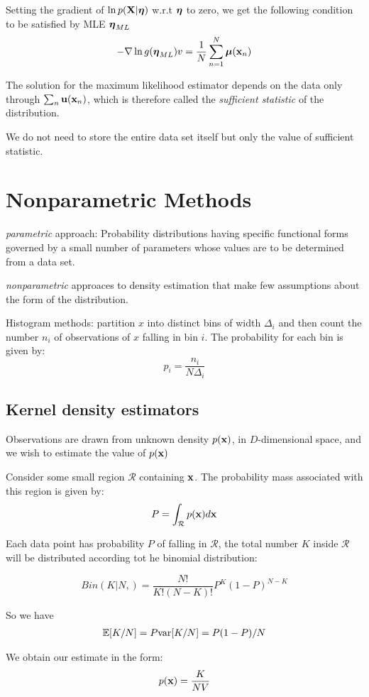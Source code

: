 Setting the gradient of $\ln p(\mathbf{X}|\boldsymbol\eta)$ w.r.t $\boldsymbol\eta$ to zero, we get
the following condition to be satisfied by MLE $\boldsymbol\eta_{ML}$
\begin{equation}
    -\nabla \ln{g(\boldsymbol\eta_{ML})} v= \frac{1}{N} \sum_{n=1}^N \boldsymbol\mu
    (\mathbf{x}_{n})
\end{equation}

The solution for the maximum likelihood estimator depends on the data only
through $\sum_n \mathbf{u}(\mathbf{x}_n)$, which is therefore called the
\emph{sufficient statistic} of the distribution.

We do not need to store the entire data set itself but only the value of
sufficient statistic.

\section{Nonparametric Methods}
\emph{parametric} approach: Probability distributions having specific
functional forms governed by a small number of parameters whose values are
to be determined from a data set.

\emph{nonparametric} approaces to density estimation that make few
assumptions about the form of the distribution. 

Histogram methods: partition $x$ into distinct bins of width $\Delta_i$
and then count the number $n_i$ of observations of $x$ falling in bin
$i$. The probability for each bin is given by:
\begin{equation}
    p_i = \frac{n_i}{N\Delta_i}
\end{equation}


\subsection{Kernel density estimators}
Observations are drawn from unknown density $p(\mathbf{x})$, in $D$-dimensional
space, and we wish to estimate the value of $p(\mathbf{x})$

Consider some small region $\mathcal{R}$ containing $\mathbf{x}$. The probability
mass associated with this region is given by:
\begin{equation}
    P = \int_{\mathcal{R}} p(\mathbf{x}) d\mathbf{x}
\end{equation}

Each data point has probability $P$ of falling in $\mathcal{R}$, the
total number $K$ inside $\mathcal{R}$ will be distributed according tot he
binomial distribution:

\begin{equation}
    Bin(K|N,) = \frac{N!}{K!(N-K)!} P^K{(1-P)}^{N-K}
\end{equation}

So we have 
\begin{align*}
    \mathbb{E}[K/N] = P
    \mbox{var}[K/N] = P(1-P)/N
\end{align*}

We obtain our estimate in the form:
\begin{equation}
    p(\mathbf{x}) = \frac{K}{NV}
\end{equation}

